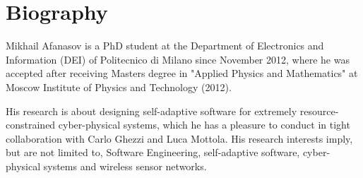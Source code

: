 \section{Biography}

Mikhail Afanasov is a PhD student at the Department of Electronics and Information (DEI) of
Politecnico di Milano since November 2012, where he was accepted after receiving
Masters degree in "Applied Physics and Mathematics" at Moscow Institute of
Physics and Technology (2012).

His research is about designing self-adaptive software for extremely
resource-constrained cyber-physical systems, which he has a pleasure to conduct
in tight collaboration with Carlo Ghezzi and Luca Mottola. His research interests
imply, but are not limited to, Software Engineering, self-adaptive software,
cyber-physical systems and wireless sensor networks.

